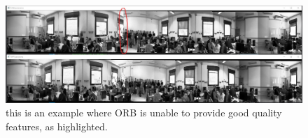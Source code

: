 \documentclass{article}
\begin{document}
\begin{figure}[h]
\begin{center}
\includegraphics[width=1\textwidth]{images/lab_19_automatic}
\caption{\footnotesize{this is an example where ORB is unable to provide good quality features, as highlighted.}}
\label{img_lab_19_automatic}
\end{center}
\end{figure}
\end{document}
